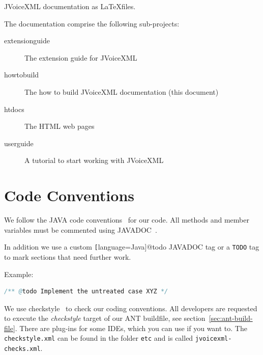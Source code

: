 \documentclass[11pt,a4paper]{article}
\begin{document}
JVoiceXML documentation as \LaTeX files.

The documentation comprise the following sub-projects:

\begin{description}
\item[extensionguide] The extension guide for JVoiceXML
\item[howtobuild] The how to build JVoiceXML documentation (this document)
\item[htdocs] The HTML web pages
\item[userguide] A tutorial to start working with JVoiceXML
\end{description}

\section{Code Conventions}
\label{sec:code-conventions}

We follow the JAVA code conventions~\cite{sun:codeconv} for our code. All
methods and member variables must be commented using 
JAVADOC~\cite{sun:javadoc_guidelines}.

In addition we use a custom \texttt[language=Java]{@todo} JAVADOC tag or a
\texttt{TODO} tag to mark sections that need further work.

Example:

\begin{lstlisting}[language=Java]
/** @todo Implement the untreated case XYZ */
\end{lstlisting}

We use checkstyle~\cite{checkstyle} to check our coding conventions.
All developers are requested to execute the \emph{checkstyle} target
of our ANT buildfile, see section~\ref{sec:ant-build-file}. 
There are plug-ins for some IDEs, which you can use if you want to. The
\texttt{checkstyle.xml} can be found in the folder 
\texttt{etc} and is called \texttt{jvoicexml-checks.xml}.
\end{document}
